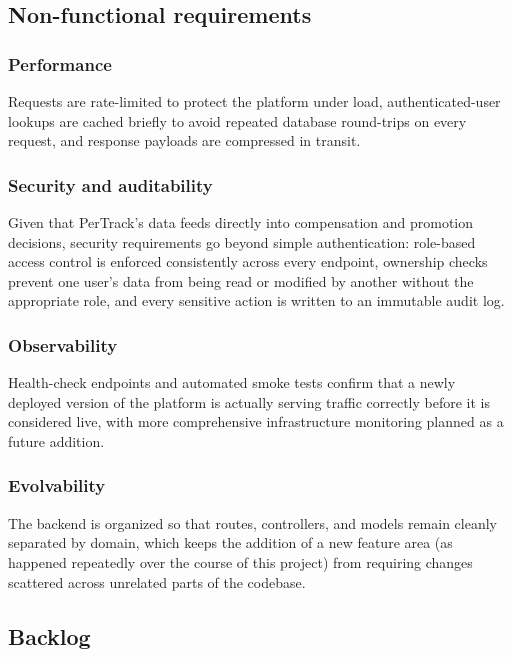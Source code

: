\documentclass[12pt,a4paper]{report}
\begin{document}
\subsection{Non-functional requirements}

\subsubsection{Performance}

Requests are rate-limited to protect the platform under load, authenticated-user lookups are cached briefly to avoid repeated database round-trips on every request, and response payloads are compressed in transit.

\subsubsection{Security and auditability}

Given that PerTrack's data feeds directly into compensation and promotion decisions, security requirements go beyond simple authentication: role-based access control is enforced consistently across every endpoint, ownership checks prevent one user's data from being read or modified by another without the appropriate role, and every sensitive action is written to an immutable audit log.

\subsubsection{Observability}

Health-check endpoints and automated smoke tests confirm that a newly deployed version of the platform is actually serving traffic correctly before it is considered live, with more comprehensive infrastructure monitoring planned as a future addition.

\subsubsection{Evolvability}

The backend is organized so that routes, controllers, and models remain cleanly separated by domain, which keeps the addition of a new feature area (as happened repeatedly over the course of this project) from requiring changes scattered across unrelated parts of the codebase.

\subsection{Backlog}
\end{document}
